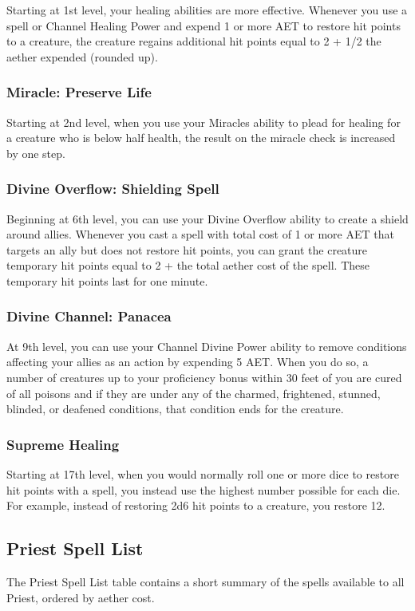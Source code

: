 Starting at 1st level, your healing abilities are more effective. Whenever you use a spell or Channel Healing Power and expend 1 or more AET to restore hit points to a creature, the creature regains additional hit points equal to 2 + 1/2 the aether expended (rounded up).

\subsubsection{Miracle: Preserve Life}

Starting at 2nd level, when you use your Miracles ability to plead for healing for a creature who is below half health, the result on the miracle check is increased by one step.

\subsubsection{Divine Overflow: Shielding Spell}

Beginning at 6th level, you can use your Divine Overflow ability to create a shield around allies. Whenever you cast a spell with total cost of 1 or more AET that targets an ally but does not restore hit points, you can grant the creature temporary hit points equal to 2 + the total aether cost of the spell. These temporary hit points last for one minute.

\subsubsection{Divine Channel: Panacea}
At 9th level, you can use your Channel Divine Power ability to remove conditions affecting your allies as an action by expending 5 AET. When you do so, a number of creatures up to your proficiency bonus within 30 feet of you are cured of all poisons and if they are under any of the charmed, frightened, stunned, blinded, or deafened conditions, that condition ends for the creature.

\subsubsection{Supreme Healing}

Starting at 17th level, when you would normally roll one or more dice to restore hit points with a spell, you instead use the highest number possible for each die. For example, instead of restoring 2d6 hit points to a creature, you restore 12.

\subsection{Priest Spell List}
The Priest Spell List table contains a short summary of the spells available to all Priest, ordered by aether cost. 

